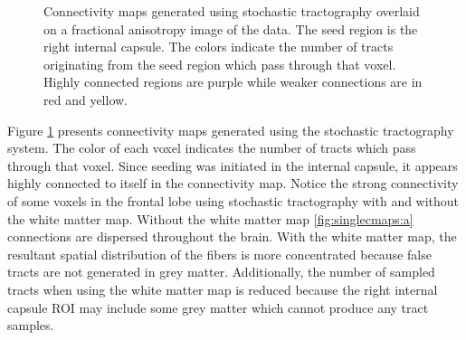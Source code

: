 \begin{figure}
	\caption{Connectivity maps generated using stochastic tractography overlaid on a fractional anisotropy image of the data.  The seed region is the right internal capsule.  The colors indicate the number of tracts originating from the seed region which pass through that voxel.  Highly connected regions are purple while weaker connections are in red and yellow.}
  \label{fig:singlecmaps}
\end{figure}

Figure \ref{fig:singlecmaps} presents connectivity maps generated using the stochastic tractography system.  The color of each voxel indicates the number of tracts which pass through that voxel.  Since seeding was initiated in the internal capsule, it appears highly connected to itself in the connectivity map.  Notice the strong connectivity of some voxels in the frontal lobe using stochastic tractography with and without the white matter map.  Without the white matter map \ref{fig:singlecmaps:a} connections are dispersed throughout the brain.  With the white matter map, the resultant spatial distribution of the fibers is more concentrated because false tracts are not generated in grey matter.  Additionally, the number of sampled tracts when using the white matter map is reduced because the right internal capsule ROI may include some grey matter which cannot produce any tract samples.


